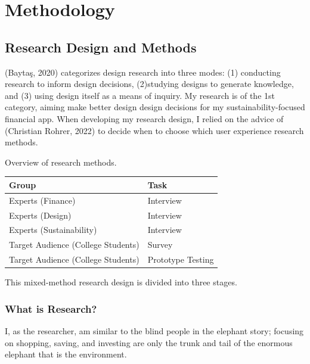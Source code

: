 \documentclass[
  12pt,
  letterpaper,
  DIV=11,
  numbers=noendperiod]{scrartcl}
\begin{document}
\newpage

\section{Methodology}\label{methodology}

\subsection{Research Design and
Methods}\label{research-design-and-methods}

(Baytaş, 2020) categorizes design research into three modes: (1)
conducting research to inform design decisions, (2)studying designs to
generate knowledge, and (3) using design itself as a means of inquiry.
My research is of the 1st category, aiming make better design design
decisions for my sustainability-focused financial app. When developing
my research design, I relied on the advice of (Christian Rohrer, 2022)
to decide when to choose which user experience research methods.

Overview of research methods.

\begin{longtable}[]{@{}ll@{}}
\toprule\noalign{}
Group & Task \\
\midrule\noalign{}
\endhead
\bottomrule\noalign{}
\endlastfoot
Experts (Finance) & Interview \\
Experts (Design) & Interview \\
Experts (Sustainability) & Interview \\
Target Audience (College Students) & Survey \\
Target Audience (College Students) & Prototype Testing \\
\end{longtable}

This mixed-method research design is divided into three stages.

\subsubsection{What is Research?}\label{what-is-research}

I, as the researcher, am similar to the blind people in the elephant
story; focusing on shopping, saving, and investing are only the trunk
and tail of the enormous elephant that is the environment.
\end{document}
